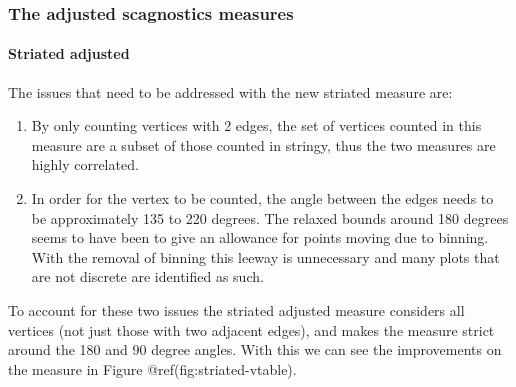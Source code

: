 \hypertarget{the-adjusted-scagnostics-measures}{%
\subsubsection{The adjusted scagnostics
measures}\label{the-adjusted-scagnostics-measures}}

\hypertarget{striated-adjusted}{%
\paragraph{Striated adjusted}\label{striated-adjusted}}

The issues that need to be addressed with the new striated measure are:

\begin{enumerate}
\def\labelenumi{\arabic{enumi}.}
\tightlist
\item
  By only counting vertices with 2 edges, the set of vertices counted in
  this measure are a subset of those counted in stringy, thus the two
  measures are highly correlated.
\item
  In order for the vertex to be counted, the angle between the edges
  needs to be approximately 135 to 220 degrees. The relaxed bounds
  around 180 degrees seems to have been to give an allowance for points
  moving due to binning. With the removal of binning this leeway is
  unnecessary and many plots that are not discrete are identified as
  such.
\end{enumerate}

To account for these two issues the striated adjusted measure considers
all vertices (not just those with two adjacent edges), and makes the
measure strict around the 180 and 90 degree angles. With this we can see
the improvements on the measure in Figure @ref(fig:striated-vtable).

